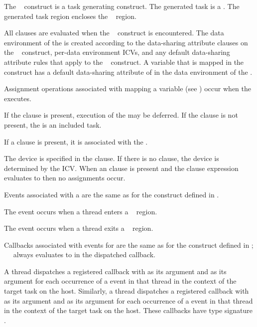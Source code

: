 The ~ construct is a task generating construct.  
The generated task is a .  The generated task region encloses 
the ~ region.

All clauses are evaluated when the ~ construct is 
encountered.  The data environment of the  is created according 
to the data-sharing attribute clauses on the ~ construct, 
per-data environment ICVs, and any default data-sharing attribute rules that apply 
to the ~ construct.  A variable that is mapped in the 
~ construct has a default data-sharing attribute of 
 in the data environment of the .

Assignment operations associated with mapping a variable (see 
) occur when the  executes.

If the  clause is present, execution of the  may 
be deferred.  If the  clause is not present, the  
is an included task.

If a  clause is present, it is associated with the .

The device is specified in the  clause. If there is no  
clause, the device is determined by the  ICV. When an 
 clause is present and the  clause expression evaluates to 
 then no assignments occur.

\events

Events associated with a  are the same as for the  
construct defined in .

The  event occurs when a thread enters a
~ region.

The  event occurs when a thread exits a
~ region.

\tools

Callbacks associated with events for  are the same as
for the  construct defined in ;
\code{(}~\code{&}~ 
always evaluates to  in the dispatched callback.

A thread dispatches a registered  callback with 
 as its  argument and 
 as its  argument for each occurrence 
of a  event in that thread in the context of the 
target task on the host. Similarly, a thread dispatches a registered 
 callback with  as its 
 argument and  as its  
argument for each occurrence of a  event in that thread 
in the context of the target task on the host. These callbacks have 
type signature . 



